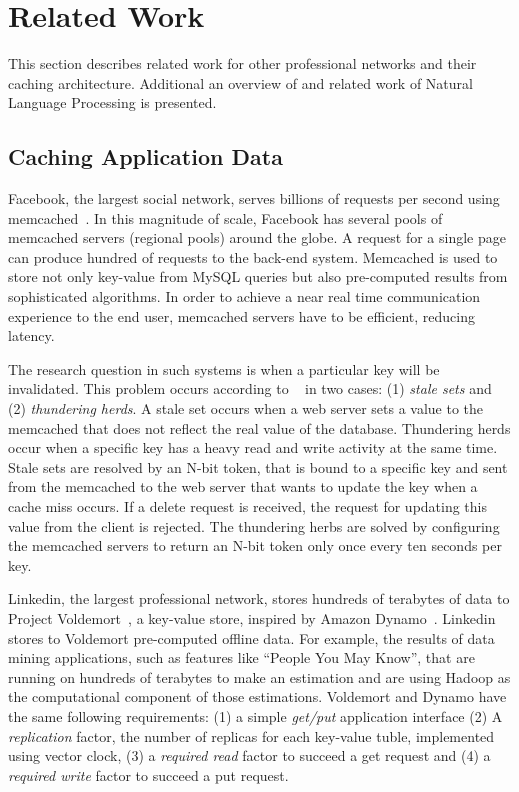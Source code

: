 \section{Related Work}
This section describes related work for other professional networks and their caching architecture. Additional an overview of and related work of Natural Language Processing is presented. 

\subsection{Caching Application Data}
Facebook, the largest social network, serves billions of requests per second using memcached~\cite{nishtala2013scaling}. In this magnitude of scale, Facebook has several pools of memcached servers (regional pools) around the globe. A request for a single page can produce hundred of requests to the back-end system. Memcached is used to store not only key-value from MySQL queries but also pre-computed results from sophisticated algorithms. 
In order to achieve a near real time communication experience to the end user, memcached servers have to be efficient, reducing latency. 

The research question in such systems is when a particular key will be invalidated. This problem occurs according to ~\cite{nishtala2013scaling} in two cases: (1) \emph{stale sets} and (2) \emph{thundering herds}. A stale set occurs when a web server sets a value to the memcached that does not reflect the real value of the database. Thundering herds occur when a specific key has a heavy read and write activity at the same time. Stale sets are resolved by an N-bit token, that is bound to a specific key and sent from the memcached to the web server that wants to update the key when a cache miss occurs. If a delete request is received, the request for updating this value from the client is rejected. The thundering herbs are solved by configuring the memcached servers to return an N-bit token only once every ten seconds per key.

Linkedin, the largest professional network, stores hundreds of terabytes of data to Project Voldemort~\cite{sumbaly2012serving}, a key-value store, inspired by Amazon Dynamo~\cite{decandia2007dynamo}. Linkedin stores to Voldemort pre-computed offline data. For example, the results of data mining applications, such as features like ``People You May Know'', that are running on hundreds of terabytes to make an estimation and are using Hadoop as the computational component of those estimations. 
Voldemort and Dynamo have the same following requirements: (1) a simple \emph{get/put} application interface (2) A \emph{replication} factor, the number of replicas for each key-value tuble, implemented using vector clock, (3) a \emph{required read} factor to succeed a get request and (4) a \emph{required write} factor to succeed a put request. 

